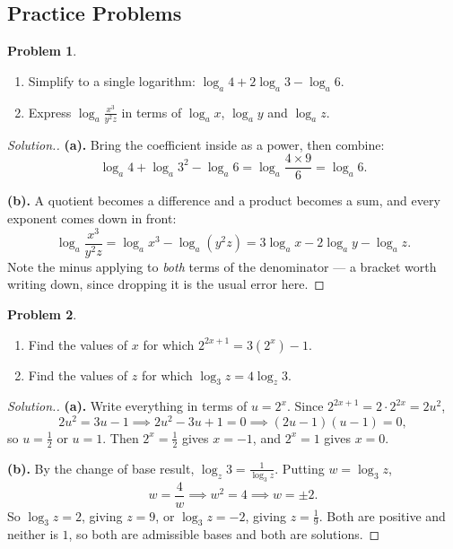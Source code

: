 \documentclass[11pt,a4paper]{article}
\theoremstyle{definition}
\newtheorem{problemx}{Problem}[section]
\newenvironment{problem}{\begin{problemx}}{\end{problemx}}
\newenvironment{solution}
  {\renewcommand{\qedsymbol}{}\begin{proof}[\textit{Solution}.]}
  {\end{proof}}
\begin{document}
\pagebreak

\subsection{Practice Problems}

\begin{problem}
\begin{enumerate}
\item[(a).] Simplify to a single logarithm: $\log_a 4+2\log_a 3-\log_a 6$.
\item[(b).] Express $\log_a\frac{x^{3}}{y^{2}z}$ in terms of $\log_a x$,
$\log_a y$ and $\log_a z$.
\end{enumerate}
\end{problem}

\begin{solution}
\textbf{(a).} Bring the coefficient inside as a power, then combine:
$$\log_a 4+\log_a 3^{2}-\log_a 6=\log_a\frac{4\times 9}{6}=\log_a 6 .$$

\textbf{(b).} A quotient becomes a difference and a product becomes a sum, and
every exponent comes down in front:
$$\log_a\frac{x^{3}}{y^{2}z}=\log_a x^{3}-\log_a\left(y^{2}z\right)
=3\log_a x-2\log_a y-\log_a z .$$
Note the minus applying to \emph{both} terms of the denominator --- a bracket worth
writing down, since dropping it is the usual error here.
\end{solution}

\begin{problem}
\begin{enumerate}
\item[(a).] Find the values of $x$ for which $2^{2x+1}=3\left(2^{x}\right)-1$.
\item[(b).] Find the values of $z$ for which $\log_3 z=4\log_z 3$.
\end{enumerate}
\end{problem}

\begin{solution}
\textbf{(a).} Write everything in terms of $u=2^{x}$. Since
$2^{2x+1}=2\cdot 2^{2x}=2u^{2}$,
$$2u^{2}=3u-1 \implies 2u^{2}-3u+1=0 \implies (2u-1)(u-1)=0 ,$$
so $u=\frac{1}{2}$ or $u=1$. Then $2^{x}=\frac{1}{2}$ gives $x=-1$, and $2^{x}=1$
gives $x=0$.

\textbf{(b).} By the change of base result, $\log_z 3=\frac{1}{\log_3 z}$. Putting
$w=\log_3 z$,
$$w=\frac{4}{w} \implies w^{2}=4 \implies w=\pm 2 .$$
So $\log_3 z=2$, giving $z=9$, or $\log_3 z=-2$, giving $z=\frac{1}{9}$. Both are
positive and neither is $1$, so both are admissible bases and both are solutions.
\end{solution}
\end{document}
